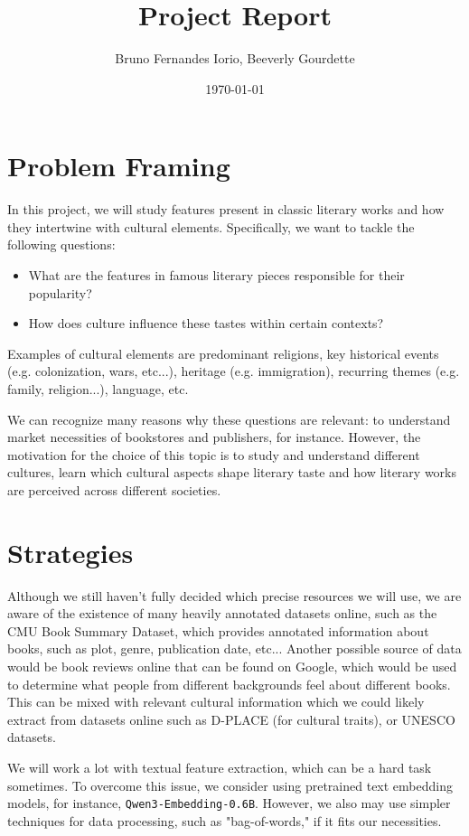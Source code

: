 \documentclass{article}
\title{Project Report}
\author{Bruno Fernandes Iorio, Beeverly Gourdette}
\date{\today}
\begin{document}
\maketitle

\section{Problem Framing}
In this project, we will study features present in classic literary works and how they intertwine with cultural elements. Specifically, we want to tackle the 
following questions: 
\begin{itemize}
  \item What are the features in famous literary pieces responsible for their popularity? 
  \item How does culture influence these tastes within certain contexts? 
\end{itemize}

\noindent 
Examples of cultural elements are predominant religions, key historical events (e.g. colonization, wars, etc...), heritage (e.g. immigration), recurring themes (e.g. family, religion...), language, etc.

We can recognize many reasons why these questions are relevant: to understand market necessities of bookstores and publishers, for instance. However, the motivation for the choice 
of this topic is to study and understand different cultures, learn which cultural aspects shape literary taste and how literary works are perceived across different societies.

\section{Strategies}
Although we still haven't fully decided which precise resources we will use, we are aware of the existence of many heavily annotated datasets online, such as the CMU Book Summary Dataset,
which provides annotated information about books, such as plot, genre, publication date, etc... Another possible source of data would be book reviews online that can be found on Google,
which would be used to determine what people from different backgrounds feel about different books. This can be 
mixed with relevant cultural information which we could likely extract from datasets online such as D-PLACE (for cultural traits), or UNESCO datasets.

We will work a lot with textual feature extraction, which can be a hard task sometimes. To overcome this issue, we consider using pretrained text embedding models, for instance, \texttt{Qwen3-Embedding-0.6B}. 
However, we also may use simpler techniques for data processing, such as "bag-of-words," if it fits our necessities.
\end{document}
